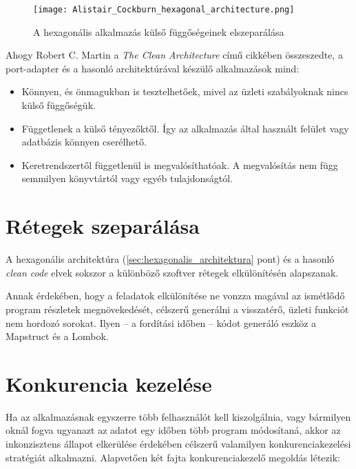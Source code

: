 \begin{figure}[hbt] 
	\centering
	\texttt{[image: Alistair\_Cockburn\_hexagonal\_architecture.png]}
	\caption[Hexagonális alkalmazások felépítése]{
		A hexagonális alkalmazás külső függőségeinek elszeparálása}
	\label{fig:Alistair_Cockburn_hexagonal_architecture}
\end{figure}



Ahogy \foreignlanguage{british}{Robert C. Martin} a \foreignlanguage{british}{\textit{The Clean Architecture}} című cikkében \cite{The_Clean_Architecture} összeszedte, a port-adapter és a hasonló architektúrával készülő alkalmazások mind:	
\begin{itemize}
	\item Könnyen, és önmagukban is tesztelhetőek, mivel az üzleti szabályoknak nincs külső függőségük.
	
	\item Függetlenek a külső tényezőktől. Így az alkalmazás által használt felület vagy adatbázis könnyen cserélhető.
	
	\item Keretrendszertől függetlenül is megvalósíthatóak. A megvalósítás nem függ semmilyen könyvtártól vagy egyéb tulajdonságtól.
\end{itemize}
	


\section{Rétegek szeparálása}\label{sec:retegek_szeparalasa}
A hexagonális architektúra (\ref{sec:hexagonalis_architektura} pont) és a hasonló \textit{clean code} \cite{clean_code_chapter_systems} elvek sokszor a különböző szoftver rétegek elkülönítésén alapszanak.


Annak érdekében, hogy a feladatok elkülönítése ne vonzza magával az ismétlődő program részletek megnövekedését, célszerű generálni a visszatérő, üzleti funkciót nem hordozó sorokat. Ilyen --  a fordítási időben --   kódot generáló eszköz a Mapstruct és a Lombok.


\section{Konkurencia kezelése}\label{sec:konkurencia_kezekese}
Ha az alkalmazásnak egyszerre több felhasználót kell kiszolgálnia, vagy bármilyen oknál fogva ugyanazt az adatot egy időben több program módosítaná, akkor az inkonzisztens állapot elkerülése érdekében célszerű valamilyen konkurenciakezelési stratégiát alkalmazni. Alapvetően két fajta konkurenciakezelő megoldás létezik:

